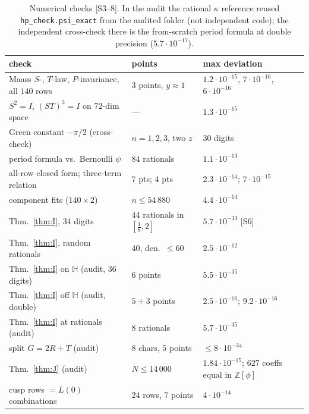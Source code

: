 \documentclass[11pt]{article}
\theoremstyle{definition}
\newcommand{\Z}{\mathbb{Z}}
\newcommand{\Hb}{\mathbb{H}}
\newcommand{\src}[1]{\textup{[S#1]}}
\begin{document}
\begin{table}[ht]\centering\small
\begin{tabular}{p{6.4cm}p{4.0cm}p{4.0cm}}\toprule
check & points & max deviation\\\midrule
Maass $S$-, $T$-law, $P$-invariance, all $140$ rows & 3 points, $y\approx1$ & $1.2\cdot10^{-15}$, $7\cdot10^{-16}$, $6\cdot10^{-16}$\\
$S^2=I$, $(ST)^3=I$ on $72$-dim space & --- & $1.3\cdot10^{-15}$\\
Green constant $-\pi/2$ (cross-check) & $n=1,2,3$, two $z$ & 30 digits\\
period formula vs.\ Bernoulli $\psi$ & $84$ rationals & $1.1\cdot10^{-13}$\\
all-row closed form; three-term relation & $7$ pts; $4$ pts & $2.3\cdot10^{-14}$; $7\cdot10^{-15}$\\
component fits ($140\times2$) & $n\le54\,880$ & $4.4\cdot10^{-14}$\\
Thm.~\ref{thm:I}, 34 digits & $44$ rationals in $[\tfrac18,2]$ & $5.7\cdot10^{-33}$ \src{6}\\
Thm.~\ref{thm:I}, random rationals & $40$, den.\ $\le60$ & $2.5\cdot10^{-12}$\\
Thm.~\ref{thm:I} on $\Hb$ (audit, 36 digits) & $6$ points & $5.5\cdot10^{-35}$\\
Thm.~\ref{thm:I} off $\Hb$ (audit, double) & $5+3$ points & $2.5\cdot10^{-16}$; $9.2\cdot10^{-16}$\\
Thm.~\ref{thm:I} at rationals (audit) & $8$ rationals & $5.7\cdot10^{-35}$\\
split $G=2R+T$ (audit) & $8$ chars, $5$ points & $\le8\cdot10^{-34}$\\
Thm.~\ref{thm:J} (audit) & $N\le14\,000$ & $1.84\cdot10^{-15}$; $627$ coeffs equal in $\Z[\phi]$\\
cusp rows $=L(0)$ combinations & $24$ rows, $7$ points & $4\cdot10^{-14}$\\\bottomrule
\end{tabular}
\caption{Numerical checks \src{3--8}. In the audit the rational $\kappa$ reference reused \texttt{hp\_check.psi\_exact} from the audited folder
(not independent code); the independent cross-check there is the from-scratch period formula at double precision ($5.7\cdot10^{-17}$).}
\end{table}
\end{document}
